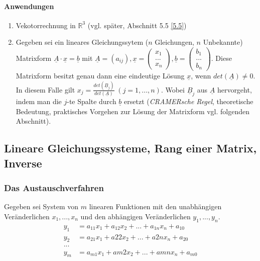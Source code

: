 \paragraph{Anwendungen}
\begin{enumerate}
\item Vekotorrechnung in $\mathbb{R}^3$ (vgl. später, Abschnitt 5.5 \ref{5.5})
\item Gegeben sei ein lineares Gleichungssytem ($n$ Gleichungen, $n$ Unbekannte)\\
Matrixform $\boxed{\underline{A}\cdot \underline{x}=\underline{b}}$ mit $\underline{A}=(a_{ij}), \underline{x}=\begin{pmatrix}
x_1\\
...\\
x_n
\end{pmatrix}, \underline{b}=\begin{pmatrix}
b_1\\
...\\
b_n
\end{pmatrix}$. Diese Matrixform besitzt genau dann eine eindeutige Lösung $\underline{x}$, wenn $det(\underline{A})\not = 0$. \\
In diesem Falle gilt $\boxed{x_j=\frac{det(\underline{B}_j)}{det(\underline{A})}}\; (j=1,...,n)$. Wobei $\underline{B}_j$ aus $\underline{A}$ hervorgeht, indem man die $j$-te Spalte durch $\underline{b}$ ersetzt (\emph{CRAMERsche Regel}, theoretische Bedeutung, praktisches Vorgehen zur Lösung der Matrixform vgl. folgenden Abschnitt).
\end{enumerate}

\subsection{Lineare Gleichungssysteme, Rang einer Matrix, Inverse}
\subsubsection{Das Austauschverfahren}
Gegeben sei System von $m$ linearen Funktionen mit den unabhängigen Veränderlichen $x_1,...,x_n$ und den abhängigen Veränderlichen $y_1,...,y_n$.
\begin{align*}
y_1&= a_{11}x_{1}+a_{12}x_{2}+...+a_{1n}x_{n}+a_{10}\\
y_2&= a_{21}x_{1}+a{22}x_{2}+...+a{2n}x_{n}+a_{20}\\
...\\
y_m&=a_{m1}x_{1}+a{m2}x_{2}+...+a{mn}x_{n}+a_{m0}
\end{align*}

